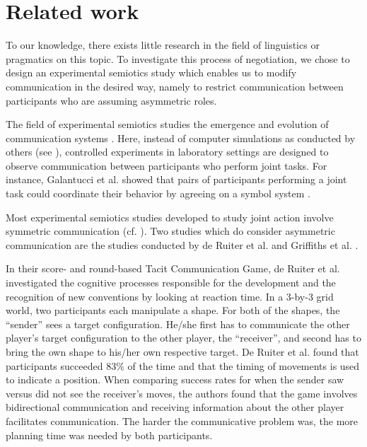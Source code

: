 \section{Related work}


To our knowledge, there exists little research in the field of linguistics or pragmatics on this topic. To investigate this process of negotiation, we chose to design an experimental semiotics study which enables us to modify communication in the desired way, namely to restrict communication between participants who are assuming asymmetric roles.

The field of experimental semiotics studies the emergence and evolution of communication systems \cite{galantucci2009experimental}. Here, instead of computer simulations as conducted by others (see \cite{cangelosi2002simulating,steels2012experiments}), controlled experiments in laboratory settings are designed to observe communication between participants who perform joint tasks. For instance, Galantucci et al. showed that pairs of participants performing a joint task could coordinate their behavior by agreeing on a symbol system \cite{galantucci2005experimental}.

Most experimental semiotics studies developed to study joint action involve symmetric communication (cf. \cite{Galantucci2011experimental}).
Two studies which do consider asymmetric communication are the studies conducted by de Ruiter et al. \cite{de2010exploring} and Griffiths et al. \cite{griffiths2012bottom}. 

In their score- and round-based Tacit Communication Game, de Ruiter et al. investigated the cognitive processes responsible for the development and the recognition of new conventions by looking at reaction time. In a 3-by-3 grid world, two participants each manipulate a shape. For both of the shapes, the ``sender'' sees a target configuration. He/she first has to communicate the other player's target configuration to the other player, the ``receiver'', and second has to bring the own shape to his/her own respective target. De Ruiter et al. found that participants succeeded $83\%$ of the time and that the timing of movements is used to indicate a position. When comparing success rates for when the sender saw versus did not see the receiver's moves, the authors found that the game involves bidirectional communication and receiving information about the other player facilitates communication. The harder the communicative problem was, the more planning time was needed by both participants.

